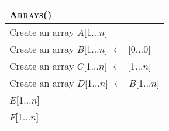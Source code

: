 \documentclass[letterpaper]{article}
\newenvironment{pseudocode}[2]{
	\noindent\begin{tabular}[t]{|>{\columncolor{funcbodybgcolor}\color{textcolor}}l|}%
	\hline
	\bigstrut[t]\cellcolor{funcnamebgcolor}\textcolor{funcnamecolor}{\textsc{#1}}(#2)\\%
	\hline
	\bigstrut[t]
}{
	\hline
	\end{tabular}\\
}
\begin{document}
\begin{pseudocode}{Arrays}{}
\textcolor{bluewordcolor}{Create an} \textcolor{classcolor}{array} \textcolor{varcolor}{$A$}[\textcolor{numbercolor}{1}$\dots$\textcolor{varcolor}{$n$}]\\
\textcolor{bluewordcolor}{Create an} \textcolor{classcolor}{array} \textcolor{varcolor}{$B$}[\textcolor{numbercolor}{1}$\dots$\textcolor{varcolor}{$n$}] $\leftarrow$ [\textcolor{numbercolor}{0}$\dots$\textcolor{numbercolor}{0}]\\
\textcolor{bluewordcolor}{Create an} \textcolor{classcolor}{array} \textcolor{varcolor}{$C$}[\textcolor{numbercolor}{1}$\dots$\textcolor{varcolor}{$n$}] $\leftarrow$ [\textcolor{numbercolor}{1}$\dots$\textcolor{varcolor}{$n$}]\\
\textcolor{bluewordcolor}{Create an} \textcolor{classcolor}{array} \textcolor{varcolor}{$D$}[\textcolor{numbercolor}{1}$\dots$\textcolor{varcolor}{$n$}] $\leftarrow$ \textcolor{varcolor}{$B$}[\textcolor{numbercolor}{1}$\dots$\textcolor{varcolor}{$n$}]\\
\textcolor{varcolor}{$E$}[\textcolor{numbercolor}{1}$\dots$\textcolor{varcolor}{$n$}]\\
\textcolor{varcolor}{$F$}[\textcolor{numbercolor}{1}$\dots$\textcolor{varcolor}{$n$}]\\
\end{pseudocode}
\end{document}
